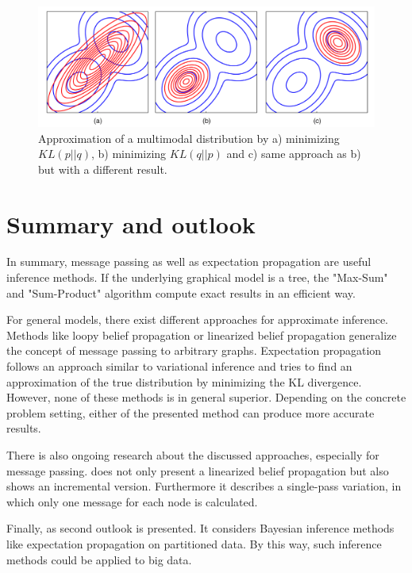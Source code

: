 \documentclass{sigkdd}
\begin{document}
\begin{figure}[h]
	\begin{center}
		\includegraphics[scale=0.12]{multimodal_approximation.png}
		\caption{Approximation of a multimodal distribution by a) minimizing $KL(p||q)$, b) minimizing $KL(q||p)$ and c) same approach as b) but with a different result.}\label{fig:multimodal}
	\end{center}
\end{figure}
\section{Summary and outlook}
In summary, message passing as well as expectation propagation are useful inference methods. If the underlying graphical model is a tree, the "Max-Sum" and "Sum-Product" algorithm compute exact results in an efficient way.

For general models, there exist different approaches for approximate inference. Methods like loopy belief propagation or linearized belief propagation generalize the concept of message passing to arbitrary graphs. Expectation propagation follows an approach similar to variational inference and tries to find an approximation of the true distribution by minimizing the KL divergence.
However, none of these methods is in general superior. Depending on the concrete problem setting, either of the presented method can produce more accurate results.

There is also ongoing research about the discussed approaches, especially for message passing. \cite{Gatterbauer:2015:LSB:2735479.2735490} does not only present a linearized belief propagation but also shows an incremental version. Furthermore it describes a single-pass variation, in which only one message for each node is calculated.

Finally, as second outlook \cite{wayoflife} is presented. It considers Bayesian inference methods like expectation propagation on partitioned data. By this way, such inference methods could be applied to big data.




\nocite{*}
\end{document}
